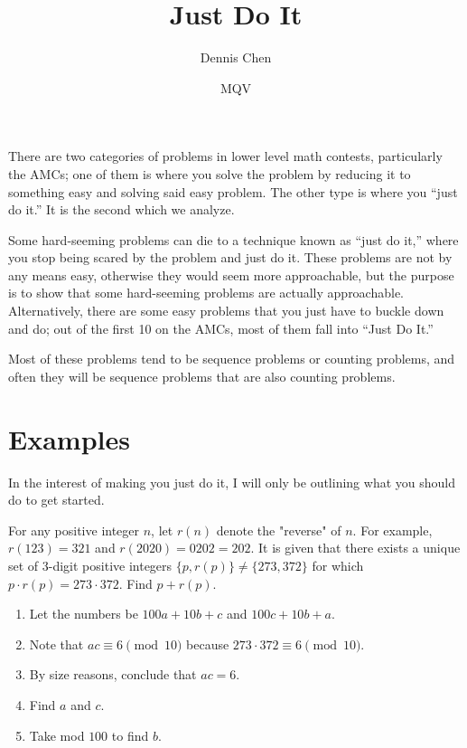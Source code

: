 \documentclass[mast]{lucky}
\title{Just Do It}
\author{Dennis Chen}
\date{MQV}
\begin{document}
\maketitle
There are two categories of problems in lower level math contests, particularly the AMCs; one of them is where you solve the problem by reducing it to something easy and solving said easy problem. The other type is where you ``just do it.'' It is the second which we analyze.

Some hard-seeming problems can die to a technique known as ``just do it,'' where you stop being scared by the problem and just do it. These problems are not by any means easy, otherwise they would seem more approachable, but the purpose is to show that some hard-seeming problems are actually approachable. Alternatively, there are some easy problems that you just have to buckle down and do; out of the first 10 on the AMCs, most of them fall into ``Just Do It.''

Most of these problems tend to be sequence problems or counting problems, and often they will be sequence problems that are also counting problems.

\section{Examples}
In the interest of making you just do it, I will only be outlining what you should do to get started.

\begin{exam}[CIME I 2021/3]
For any positive integer $n$, let $r(n)$ denote the "reverse" of $n$. For example, $r(123)=321$ and $r(2020)=0202=202.$ It is given that there exists a unique set of 3-digit positive integers $\{p, r(p)\} \neq \{273,372\}$ for which $p \cdot r(p) = 273 \cdot 372.$ Find $p+r(p).$
\end{exam}

\begin{walk}
\begin{enumerate}
\item Let the numbers be $100a+10b+c$ and $100c+10b+a.$

\item Note that $ac\equiv 6\pmod{10}$ because $273\cdot 372\equiv 6\pmod{10}.$

\item By size reasons, conclude that $ac=6.$

\item Find $a$ and $c.$

\item Take mod $100$ to find $b.$
\end{enumerate}
\end{walk}
\end{document}
